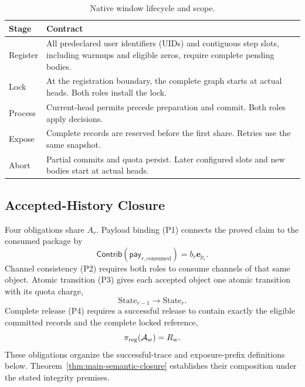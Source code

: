 \documentclass[conference,compsoc]{IEEEtran}
\theoremstyle{definition}
\numberwithin{equation}{section}
\numberwithin{table}{section}
\numberwithin{figure}{section}
\theoremstyle{plain}
\begin{document}
\begin{table}[t]
\centering
\caption{Native window lifecycle and scope.}
\label{tab:lifecycle}
\footnotesize
\renewcommand{\arraystretch}{1.08}
\begin{tabularx}{\columnwidth}{@{}lY@{}}
\toprule
\textbf{Stage} & \textbf{Contract} \\
\midrule
Register & All predeclared user identifiers (UIDs) and contiguous step slots, including warmups and eligible zeros, require complete pending bodies. \\
Lock & At the registration boundary, the complete graph starts at actual heads. Both roles install the lock. \\
Process & Current-head permits precede preparation and commit. Both roles apply decisions. \\
Expose & Complete records are reserved before the first share. Retries use the same snapshot. \\
Abort & Partial commits and quota persist. Later configured slots and new bodies start at actual heads. \\
\bottomrule
\end{tabularx}
\end{table}



\subsection{Accepted-History Closure}
\label{sec:boundaries}
\label{sec:prelim-goals}
\label{sec:composition-summary}

Four obligations share \(A_r\). Payload binding (P1) connects the proved claim to the consumed
package by
\begin{equation}
\mathsf{Contrib}(\mathsf{pay}_{r,\mathrm{consumed}})
  =b_r\mathbf e_{p_r}.
  \label{eq:p1}
\end{equation}
Channel consistency (P2) requires both roles to consume channels of that same object. Atomic transition (P3) gives each
accepted object one atomic transition with its quota charge,
\begin{equation}
  \mathrm{State}_{r-1}\rightarrow\mathrm{State}_{r}.
  \label{eq:p3}
\end{equation}
Complete release (P4) requires a successful release to contain exactly the eligible committed
records and the complete locked reference,
\begin{equation}
  \pi_{\rm reg}(\mathcal A_w)=R_w.
  \label{eq:p4}
\end{equation}
These obligations organize the successful-trace and exposure-prefix
definitions below. Theorem~\ref{thm:main-semantic-closure} establishes their
composition under the stated integrity premises.
\end{document}
